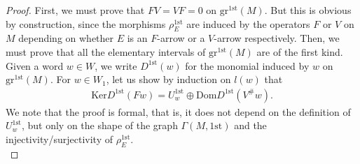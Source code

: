 \documentclass[10pt,a4paper]{amsart}
\begin{document}
\begin{proof}
    First, we must prove that $FV = VF = 0$ on $\mathrm{gr}^{1\mathrm{st}}(M)$. But this is obvious by construction, since the morphisms $\rho_{E}^{1\mathrm{st}}$ are induced by the operators $F$ or $V$ on $M$ depending on whether $E$ is an $F$-arrow or a $V$-arrow respectively. Then, we must prove that all the elementary intervals of $\mathrm{gr}^{1\mathrm{st}}(M)$ are of the first kind. Given a word $w \in W$, we write $D^{1\mathrm{st}}(w)$ for the monomial induced by $w$ on $\mathrm{gr}^{1\mathrm{st}}(M)$. For $w \in W_1$, let us show by induction on $l(w)$ that 
    \begin{align}\label{ElementaryIntervalsFirstKind}
          \mathrm{Ker}D^{1\mathrm{st}}(Fw) =  U^{1\mathrm{st}}_{w} \oplus \mathrm{Dom} D^{1\mathrm{st}}(V^{\#}w).
    \end{align}
    We note that the proof is formal, that is, it does not depend on the definition of $U^{1\mathrm{st}}_w$, but only on the shape of the graph $\Gamma(M,1\mathrm{st})$ and the injectivity/surjectivity of $\rho^{1\mathrm{st}}_E$. \\


\end{proof}
\end{document}
